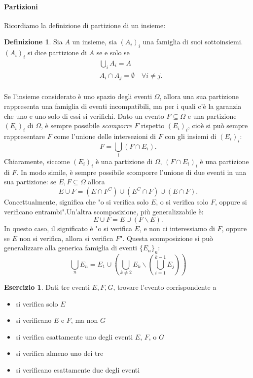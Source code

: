 \documentclass{article}
\theoremstyle{plain}
\theoremstyle{definition}
\newtheorem{definizione}{Definizione}[section]
\newtheorem{esercizio}{Esercizio}[section]
\theoremstyle{remark}
\begin{document}
\paragraph{Partizioni} %
\label{par:partizioni}
Ricordiamo la definizione di partizione di un insieme:
\begin{definizione}
	Sia $A$ un insieme, sia $(A_i)_i$ una famiglia di suoi sottoinsiemi. $(A_i)_i$ si dice partizione di $A$ se e solo se
	\begin{align*}
		&\bigcup_i A_i =A\\
		&A_i\cap A_j =\emptyset \quad\forall i\not =j\text{.}\\
	\end{align*}
\end{definizione}
Se l'insieme considerato è uno spazio degli eventi $\Omega$, allora una sua partizione rappresenta una famiglia di eventi incompatibili, ma per i quali c'è la garanzia che uno e uno solo di essi si verifichi. Dato un evento $F\subseteq\Omega$ e una partizione $(E_i)_i$ di $\Omega$, è sempre possibile \textit{scomporre} $F$ rispetto $(E_i)_i$, cioè si può sempre rappresentare $F$ come l'unione delle intersezioni di $F$ con gli insiemi di $(E_i)_i$:
\begin{equation*}
	F=\bigcup_i (F\cap E_i)\text{.}
\end{equation*}
Chiaramente, siccome $(E_i)_i$ è una partizione di $\Omega$, $(F\cap E_i)_i$ è una partizione di $F$. In modo simile, è sempre possibile scomporre l'unione di due eventi in una sua partizione: se $E,F\subseteq\Omega$ allora
\begin{equation*}
	E\cup F=(E\cap F^C)\cup(E^C\cap F)\cup (E\cap F)\text{.}
\end{equation*}
Concettualmente, significa che "o si verifica solo $E$, o si verifica solo $F$, oppure si verificano entrambi".Un'altra scomposizione, più generalizzabile è:
\begin{equation*}
	E\cup F=E\cup(F\smallsetminus E)\text{.}
\end{equation*}
In questo caso, il significato è "o si verifica $E$, e non ci interessiamo di $F$, oppure se $E$ non si verifica, allora si verifica $F$". Questa scomposizione si può generalizzare alla generica famiglia di eventi $\{E_n\}_n$:
\begin{equation*}%
	\bigcup_n E_n=E_1 \cup(\bigcup_{k\neq2} E_k\smallsetminus(\bigcup_{i=1}^{k-1} E_j))
\end{equation*}
\begin{esercizio}
	Dati tre eventi $E,F,G$, trovare l'evento corrispondente a
	\begin{itemize}
		\item si verifica solo $E$
		\item si verificano $E$ e $F$, ma non $G$
		\item si verifica esattamente uno degli eventi $E$, $F$, o $G$
		\item si verifica almeno uno dei tre
		\item si verificano esattamente due degli eventi
	\end{itemize}
\end{esercizio}
\end{document}
